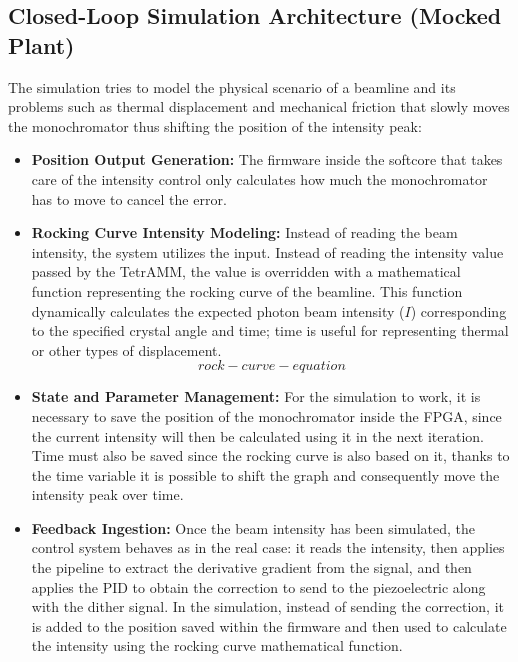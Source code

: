 \subsection{Closed-Loop Simulation Architecture (Mocked Plant)}
The simulation tries to model the physical scenario of a beamline and its problems such as thermal displacement and mechanical friction that slowly moves the monochromator thus shifting the position of the intensity peak:

\begin{itemize}
    \item \textbf{Position Output Generation:} The firmware inside the softcore that takes care of the intensity control only calculates how much the monochromator has to move to cancel the error.
    \item \textbf{Rocking Curve Intensity Modeling:} Instead of reading the beam intensity, the system utilizes the input. Instead of reading the intensity value passed by the TetrAMM, the value is overridden with a mathematical function representing the rocking curve of the beamline.
    This function dynamically calculates the expected photon beam intensity ($I$) corresponding to the specified crystal angle and time; time is useful for representing thermal or other types of displacement.
    \begin{equation}
        rock-curve-equation
    \end{equation}
    \item \textbf{State and Parameter Management:} 
    For the simulation to work, it is necessary to save the position of the monochromator inside the FPGA, since the current intensity will then be calculated using it in the next iteration.
    Time must also be saved since the rocking curve is also based on it, thanks to the time variable it is possible to shift the graph and consequently move the intensity peak over time.
    \item \textbf{Feedback Ingestion:} 
    Once the beam intensity has been simulated, the control system behaves as in the real case: it reads the intensity, then applies the pipeline to extract the derivative gradient from the signal, and then applies the PID to obtain the correction to send to the piezoelectric along with the dither signal.
    In the simulation, instead of sending the correction, it is added to the position saved within the firmware and then used to calculate the intensity using the rocking curve mathematical function.
\end{itemize}


